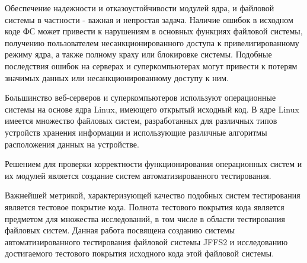 Обеспечение надежности и отказоустойчивости модулей ядра, и файловой системы в частности - важная и непростая задача. Наличие ошибок в исходном коде ФС может привести к нарушениям в основных функциях файловой системы, получению пользователем несанкционированного доступа к привелигированному режиму ядра, а также полному краху или блокировке системы. Подобные последствия ошибок на серверах и суперкомпьютерах могут привести к потерям значимых данных или несанкционированному доступу к ним.

Большинство веб-серверов и суперкомпьютеров используют операционные системы на основе ядра Linux, имеющего открытый исходный код. В ядре Linux имеется множество файловых систем, разработанных для различных типов устройств хранения информации и использующие различные алгоритмы расположения данных на устройстве. 

Решением для проверки корректности функционирования операционных систем и их модулей является создание систем автоматизированного тестирования.  

Важнейшей метрикой, характеризующей качество подобных систем тестирования является тестовое покрытие кода. Полнота тестового покрытия кода является предметом для множества исследований, в том числе в области тестирования файловых систем. Данная работа посвящена созданию системы автоматизированного тестирования файловой системы JFFS2 и исследованию достигаемого тестового покрытия исходного кода этой файловой системы.

\newpage
